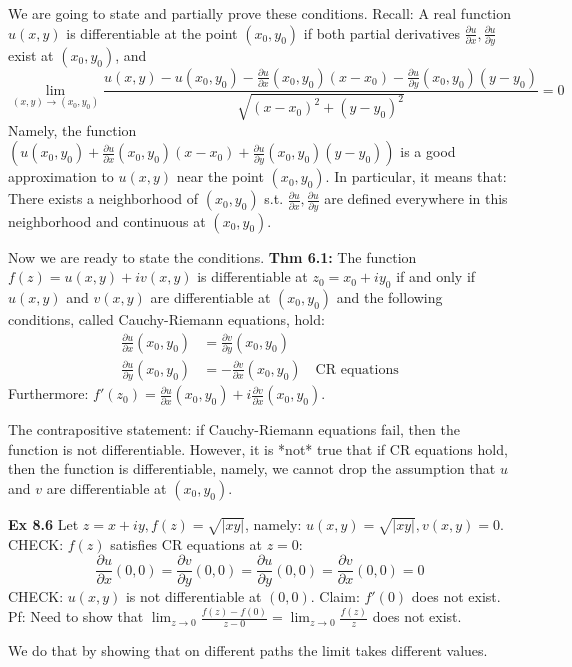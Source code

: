 \documentclass{article}
\begin{document}
We are going to state and partially prove these conditions.
Recall: A real function $u(x,y)$ is differentiable at the point $(x_0, y_0)$ if both partial derivatives $\frac{\partial u}{\partial x}, \frac{\partial u}{\partial y}$ exist at $(x_0, y_0)$, and
$$\lim_{(x,y) \to (x_0, y_0)} \frac{u(x,y) - u(x_0, y_0) - \frac{\partial u}{\partial x}(x_0, y_0)(x-x_0) - \frac{\partial u}{\partial y}(x_0, y_0)(y-y_0)}{\sqrt{(x-x_0)^2 + (y-y_0)^2}} = 0$$
Namely, the function $\left( u(x_0, y_0) + \frac{\partial u}{\partial x}(x_0, y_0)(x-x_0) + \frac{\partial u}{\partial y}(x_0, y_0)(y-y_0) \right)$ is a good approximation to $u(x,y)$ near the point $(x_0, y_0)$.
In particular, it means that: There exists a neighborhood of $(x_0, y_0)$ s.t. $\frac{\partial u}{\partial x}, \frac{\partial u}{\partial y}$ are defined everywhere in this neighborhood and continuous at $(x_0, y_0)$.

Now we are ready to state the conditions.
\textbf{Thm 6.1:} The function $f(z) = u(x,y) + iv(x,y)$ is differentiable at $z_0 = x_0 + iy_0$ if and only if $u(x,y)$ and $v(x,y)$ are differentiable at $(x_0, y_0)$ and the following conditions, called Cauchy-Riemann equations, hold:
\begin{align*}
\frac{\partial u}{\partial x}(x_0, y_0) &= \frac{\partial v}{\partial y}(x_0, y_0) \\
\frac{\partial u}{\partial y}(x_0, y_0) &= -\frac{\partial v}{\partial x}(x_0, y_0) \quad \text{CR equations}
\end{align*}
Furthermore: $f'(z_0) = \frac{\partial u}{\partial x}(x_0, y_0) + i\frac{\partial v}{\partial x}(x_0, y_0)$.

The contrapositive statement: if Cauchy-Riemann equations fail, then the function is not differentiable.
However, it is *not* true that if CR equations hold, then the function is differentiable, namely, we cannot drop the assumption that $u$ and $v$ are differentiable at $(x_0, y_0)$.

\textbf{Ex 8.6} Let $z = x+iy, f(z) = \sqrt{|xy|}$, namely: $u(x,y) = \sqrt{|xy|}, v(x,y) = 0$.
CHECK: $f(z)$ satisfies CR equations at $z=0$:
$$ \frac{\partial u}{\partial x}(0,0) = \frac{\partial v}{\partial y}(0,0) = \frac{\partial u}{\partial y}(0,0) = \frac{\partial v}{\partial x}(0,0) = 0 $$
CHECK: $u(x,y)$ is not differentiable at $(0,0)$.
Claim: $f'(0)$ does not exist.
Pf: Need to show that $\lim_{z\to 0} \frac{f(z) - f(0)}{z-0} = \lim_{z\to 0} \frac{f(z)}{z}$ does not exist.

We do that by showing that on different paths the limit takes different values.
\end{document}
